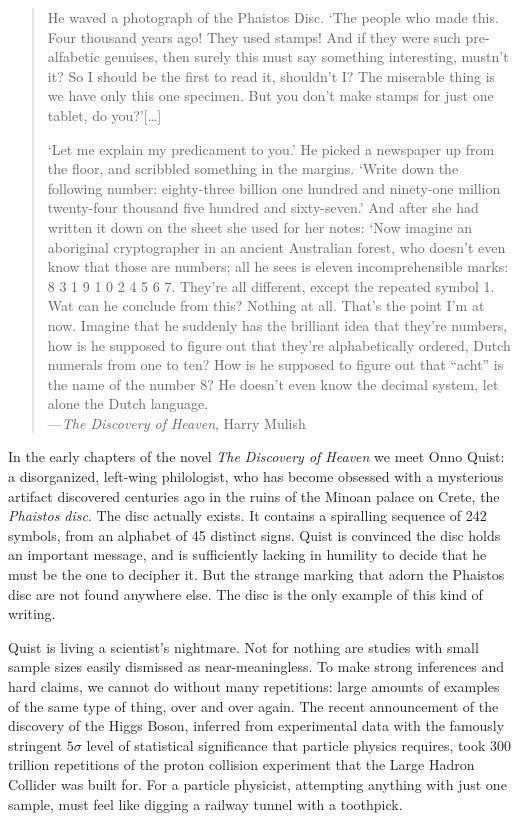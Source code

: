 \begin{quote}
He waved a photograph of the Phaistos Disc. `The people who made this. Four thousand years ago! They used stamps! And if they were such pre-alfabetic genuises, then surely this must say something interesting, mustn't it? So I should be the first to read it, shouldn't I? The miserable thing is we have only this one specimen. But you don't make stamps for just one tablet, do you?'[\ldots]

`Let me explain my predicament to you.' He picked a newspaper up from the floor, and scribbled something in the margins.
`Write down the following number: eighty-three billion one hundred and ninety-one million twenty-four thousand five hundred and sixty-seven.' And after she had written it down on the sheet she used for her notes: `Now imagine an aboriginal cryptographer in an ancient Australian forest, who doesn't even know that those are numbers; all he sees is eleven incomprehensible marks: 8 3 1 9 1 0 2 4 5 6 7. They're all different, except the repeated symbol 1. Wat can he conclude from this? Nothing at all. That's the point I'm at now. Imagine that he suddenly has the brilliant idea that they're numbers, how is he supposed to figure out that they're alphabetically ordered, Dutch numerals from one to ten? How is he supposed to figure out that ``acht'' is the name of the number 8? He doesn't even know the decimal system, let alone the Dutch language.\\
---\emph{The Discovery of Heaven}, Harry Mulish \cite{mulisch1996discovery} 
\end{quote}

In the early chapters of the novel \emph{The Discovery of Heaven} we meet Onno Quist: a disorganized, left-wing philologist, who has become obsessed with a mysterious artifact discovered centuries ago in the ruins of the Minoan palace on Crete, the \emph{Phaistos disc}. The disc actually exists. It contains a spiralling sequence of 242 symbols, from an alphabet of 45 distinct signs. Quist is convinced the disc holds an important message, and is sufficiently lacking in humility to decide that he must be the one to decipher it. But the strange marking that adorn the Phaistos disc are not found anywhere else. The disc is the only example of this kind of writing.

  

Quist is living a scientist's nightmare. Not for nothing are studies with small sample sizes easily dismissed as near-meaningless. To make strong inferences and hard claims, we cannot do without many repetitions: large amounts of examples of the same type of thing, over and over again. The recent announcement of the discovery of the Higgs Boson, inferred from experimental data with the famously stringent $5\sigma$ level of statistical significance that particle physics requires, took 300 trillion repetitions of the proton collision experiment that the Large Hadron Collider was built for. For a particle physicist, attempting anything with just one sample, must feel like digging a railway tunnel with a toothpick.

